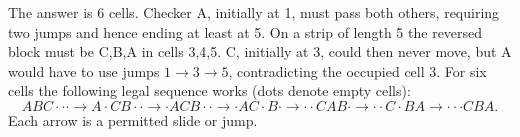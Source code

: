 The answer is $\boxed6$ cells. Checker A, initially at 1, must pass both others, requiring two jumps and hence ending at least at 5. On a strip of length 5 the reversed block must be C,B,A in cells 3,4,5. C, initially at 3, could then never move, but A would have to use jumps $1\to3\to5$, contradicting the occupied cell 3. For six cells the following legal sequence works (dots denote empty cells):
\[ABC\cdot\cdot\cdot\to A\cdot CB\cdot\cdot\to\cdot ACB\cdot\cdot\to\cdot AC\cdot B\cdot\to\cdot\cdot CAB\cdot\to\cdot\cdot C\cdot BA\to\cdot\cdot\cdot CBA.\]
Each arrow is a permitted slide or jump.
